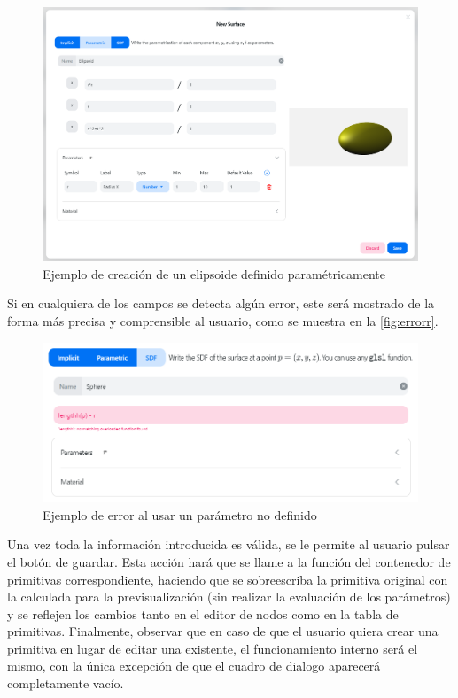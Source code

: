 \begin{figure}[ht!]
    \centering
    \includegraphics[width=\textwidth]{Plantilla-TFG-master/img/ejemploParam.png}
    \caption{Ejemplo de creación de un elipsoide definido paramétricamente}
    \label{fig:ejemploElip}
\end{figure}
Si en cualquiera de los campos se detecta algún error, este será mostrado de la forma más precisa y comprensible al usuario, como se muestra en la \autoref{fig:errorr}.
\begin{figure}[ht!]
    \centering
    \includegraphics[width=\textwidth]{Plantilla-TFG-master/img/error.png}
    \caption{Ejemplo de error al usar un parámetro no definido}
    \label{fig:errorr}
\end{figure}
Una vez toda la información introducida es válida, se le permite al usuario pulsar el botón de guardar. Esta acción hará que se llame a la función del contenedor de primitivas correspondiente, haciendo que se sobreescriba la primitiva original con la calculada para la previsualización (sin realizar la evaluación de los parámetros) y se reflejen los cambios tanto en el editor de nodos como en la tabla de primitivas. Finalmente, observar que en caso de que el usuario quiera crear una primitiva en lugar de editar una existente, el funcionamiento interno será el mismo, con la única excepción de que el cuadro de dialogo aparecerá completamente vacío.\newline

